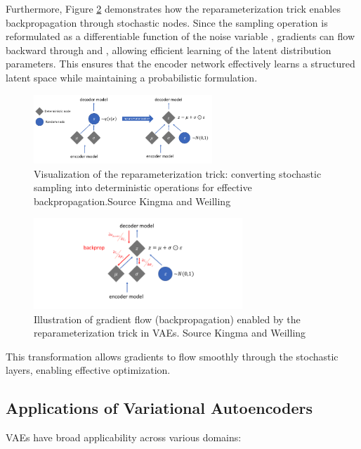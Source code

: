 Furthermore, Figure \ref{fig:reparameterization_backprop} demonstrates how the reparameterization trick enables backpropagation through stochastic nodes. Since the sampling operation is reformulated as a differentiable function of the noise variable , gradients can flow backward through  and , allowing efficient learning of the latent distribution parameters. This ensures that the encoder network effectively learns a structured latent space while maintaining a probabilistic formulation.

\begin{figure}[htbp]
    \centering
    \includegraphics[width=0.6\textwidth]{img/vae/reparameterization_trick.png}
    \caption{Visualization of the reparameterization trick: converting stochastic sampling into deterministic operations for effective backpropagation.Source Kingma and Weilling~\cite{Kingma_2019}}
    \label{fig:reparameterization_trick}
\end{figure}

\begin{figure}[htbp]
    \centering
    \includegraphics[width=0.7\textwidth]{img/vae/reparameterization_backprop.png}
    \caption{Illustration of gradient flow (backpropagation) enabled by the reparameterization trick in VAEs. Source Kingma and Weilling~\cite{Kingma_2019}}
    \label{fig:reparameterization_backprop}
\end{figure}


This transformation allows gradients to flow smoothly through the stochastic layers, enabling effective optimization.






\subsection{Applications of Variational Autoencoders}
VAEs have broad applicability across various domains:

